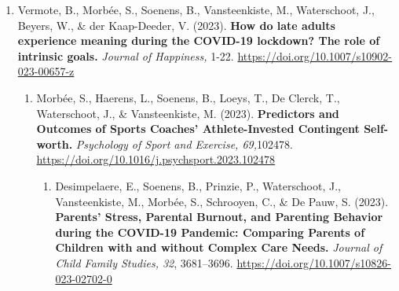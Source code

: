 \documentclass[
  twocolumn]{article}
\providecommand{\tightlist}{%
  \setlength{\itemsep}{0pt}\setlength{\parskip}{0pt}}
\begin{document}
\begin{enumerate}
\begin{enumerate}
\begin{enumerate}
\begin{enumerate}
\begin{enumerate}
\begin{enumerate}
\begin{enumerate}
\begin{enumerate}
                \begin{enumerate}
                \def\labelenumix{\arabic{enumix}.}
                \tightlist
                \item
                  Vermote, B., Morbée, S., Soenens, B., Vansteenkiste,
                  M., Waterschoot, J., Beyers, W., \& der Kaap-Deeder,
                  V. (2023). \textbf{How do late adults experience
                  meaning during the COVID-19 lockdown? The role of
                  intrinsic goals.} \emph{Journal of Happiness,} 1-22.
                  \url{https://doi.org/10.1007/s10902-023-00657-z}

                  \begin{enumerate}
                  \def\labelenumx{\arabic{enumx}.}
                  \tightlist
                  \item
                    Morbée, S., Haerens, L., Soenens, B., Loeys, T., De
                    Clerck, T., Waterschoot, J., \& Vansteenkiste, M.
                    (2023). \textbf{Predictors and Outcomes of Sports
                    Coaches' Athlete-Invested Contingent Self-worth.}
                    \emph{Psychology of Sport and Exercise, 69,}102478.
                    \url{https://doi.org/10.1016/j.psychsport.2023.102478}

                    \begin{enumerate}
                    \def\labelenumxi{\arabic{enumxi}.}
                    \tightlist
                    \item
                      Desimpelaere, E., Soenens, B., Prinzie, P.,
                      Waterschoot, J., Vansteenkiste, M., Morbée, S.,
                      Schrooyen, C., \& De Pauw, S. (2023).
                      \textbf{Parents' Stress, Parental Burnout, and
                      Parenting Behavior during the COVID-19 Pandemic:
                      Comparing Parents of Children with and without
                      Complex Care Needs.} \emph{Journal of Child Family
                      Studies, 32}, 3681--3696.
                      \url{https://doi.org/10.1007/s10826-023-02702-0}
                    \end{enumerate}
                  \end{enumerate}
                \end{enumerate}
              \end{enumerate}
            \end{enumerate}
          \end{enumerate}
        \end{enumerate}
      \end{enumerate}
    \end{enumerate}
  \end{enumerate}
\end{enumerate}
\end{document}
